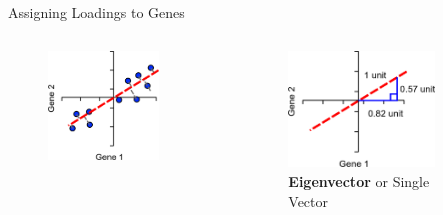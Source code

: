 \begin{frame}[allowframebreaks]{Assigning Loadings to Genes}    
    \begin{columns}
    \begin{column}{0.5\textwidth}
        \begin{figure}
            \centering
            \includegraphics[width=0.8\textwidth,keepaspectratio]{images/dul/dim-reduce/line-fit-best.png}
        \end{figure}
    \end{column}
    \begin{column}{0.5\textwidth}
        \begin{figure}
            \centering
            \includegraphics[width=0.8\textwidth,keepaspectratio]{images/dul/dim-reduce/line-eigenvector.png}
            \caption{\textbf{Eigenvector} or Single Vector}

\end{figure}
\end{column}
\end{columns}
\end{frame}
